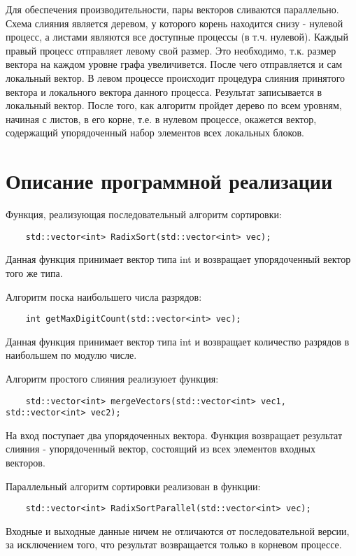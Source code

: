 \documentclass{report}
\begin{document}
    \par Для обеспечения производительности, пары векторов сливаются параллельно. Схема слияния является деревом, у которого корень находится снизу - нулевой процесс, а листами являются все доступные процессы (в т.ч. нулевой). Каждый правый процесс отправляет левому свой размер. Это необходимо, т.к. размер вектора на каждом уровне графа увеличивется. После чего отправляется и сам локальный вектор. В левом процессе происходит процедура слияния принятого вектора и локального вектора данного процесса. Результат записывается в локальный вектор.
    После того, как алгоритм пройдет дерево по всем уровням, начиная с листов, в его корне, т.е. в нулевом процессе, окажется вектор, содержащий упорядоченный набор элементов всех локальных блоков.
    
    \newpage
    \section*{Описание программной реализации}
    
    Функция, реализующая последовательный алгоритм сортировки:
    \begin{lstlisting}
    std::vector<int> RadixSort(std::vector<int> vec);
    \end{lstlisting}
    Данная функция принимает вектор типа int и возвращает упорядоченный вектор того же типа.
    
    \par Алгоритм поска наибольшего числа разрядов:
    \begin{lstlisting}
    int getMaxDigitCount(std::vector<int> vec);
    \end{lstlisting}
    Данная функция принимает вектор типа int и возвращает количество разрядов в наибольшем по модулю числе.
    
    \par Алгоритм простого слияния реализуюет функция:
    \begin{lstlisting}
    std::vector<int> mergeVectors(std::vector<int> vec1, std::vector<int> vec2);
    \end{lstlisting}
    На вход поступает два упорядоченных вектора. Функция возвращает результат слияния - упорядоченный вектор, состоящий из всех элементов входных векторов.
    
    \par Параллельный алгоритм сортировки реализован в функции:
    \begin{lstlisting}
    std::vector<int> RadixSortParallel(std::vector<int> vec);
    \end{lstlisting}
    Входные и выходные данные ничем не отличаются от последовательной версии, за исключением того, что результат возвращается только в корневом процессе.
    
\end{document}
